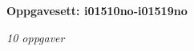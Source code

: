 \centerline{\bf Oppgavesett: i01510no-i01519no}
\vskip 10pt
\centerline{\it 10 oppgaver}\vskip 10pt
\vskip 10pt
